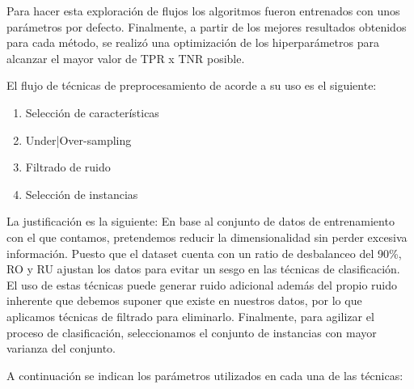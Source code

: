 Para hacer esta exploración de flujos los algoritmos fueron entrenados con unos parámetros por defecto. Finalmente, a partir de los mejores resultados obtenidos para cada método, se realizó una optimización de los hiperparámetros para alcanzar el mayor valor de TPR x TNR posible.

\vspace{\baselineskip}

El flujo de técnicas de preprocesamiento de acorde a su uso es el siguiente:
\begin{enumerate}
    \item Selección de características
    \item Under|Over-sampling
    \item Filtrado de ruido
    \item Selección de instancias
\end{enumerate}

\vspace{\baselineskip}

La justificación es la siguiente: En base al conjunto de datos de entrenamiento con el que contamos, pretendemos reducir la dimensionalidad sin perder excesiva información. Puesto que el dataset cuenta con un ratio de desbalanceo del 90\%, RO y RU ajustan los datos para evitar un sesgo en las técnicas de clasificación. El uso de estas técnicas puede generar ruido adicional además del propio ruido inherente que debemos suponer que existe en nuestros datos, por lo que aplicamos técnicas de filtrado para eliminarlo. Finalmente, para agilizar el proceso de clasificación, seleccionamos el conjunto de instancias con mayor varianza del conjunto.

\vspace{\baselineskip}

A continuación se indican los parámetros utilizados en cada una de las técnicas:

